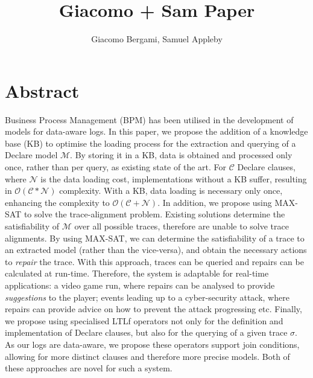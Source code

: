 \documentclass{article}
\author{Giacomo Bergami, Samuel Appleby}
\title{Giacomo + Sam Paper}
\theoremstyle{definition}
\begin{document}
	
	\maketitle
	\section*{Abstract}
	Business Process Management (BPM) has been utilised in the development of models for data-aware logs. In this paper, we propose the addition of a knowledge base (KB) to optimise the loading process for the extraction and querying of a Declare model $\mathcal{M}$. By storing it in a KB,  data is obtained and processed only once, rather than per query, as existing state of the art. For $\mathcal{C}$ Declare clauses, where $\mathcal{N}$ is the data loading cost, implementations without a KB suffer, resulting in $\mathcal{O(C * N)}$ complexity. With a KB, data loading is necessary only once, enhancing the complexity to $\mathcal{O(C + N)}$. In addition, we propose using MAX-SAT to solve the trace-alignment problem. Existing solutions determine the satisfiability of $\mathcal{M}$ over all possible traces, therefore are unable to solve trace alignments. By using MAX-SAT, we can determine the satisfiability of a trace to an extracted model (rather than the vice-versa), and obtain the necessary actions to \emph{repair} the trace. With this approach, traces can be queried and repairs can be calculated at run-time. Therefore, the system is adaptable for real-time applications: a video game run, where repairs can be analysed to provide \emph{suggestions} to the player; events leading up to a cyber-security attack, where repairs can provide advice on how to prevent the attack progressing etc. Finally, we propose using specialised LTLf operators not only for the definition and implementation of Declare clauses, but also for the querying of a given trace $\sigma$. As our logs are data-aware, we propose these operators support join conditions, allowing for more distinct clauses and therefore more precise models. Both of these approaches are novel for such a system.
\end{document}
